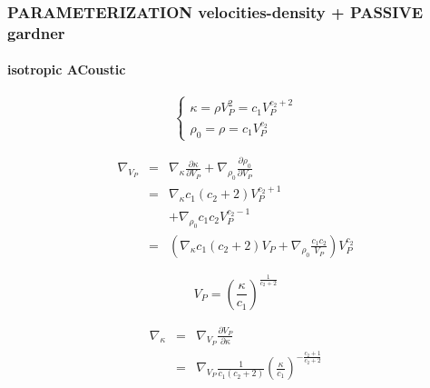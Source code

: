 \documentclass[9pt]{beamer}
\newcommand{\partderi}[2]{\frac{\partial#1}{\partial#2}}
\begin{document}
\begin{frame}\frametitle{PARAMETERIZATION velocities-density + PASSIVE gardner}
\framesubtitle{isotropic ACoustic}

  \begin{center}
  \end{center}

  \begin{minipage}{0.5\linewidth}
    \[\left\{ \begin{array}{l}
      \kappa = \rho V_P^2 = c_1 V_P^{c_2+2} \\
      \rho_0 = \rho = c_1 V_P ^{c_2}
    \end{array} \right.\]
    
    \begin{eqnarray}
      \nabla_{V_P} &=& \nabla_{\kappa} \partderi{\kappa}{V_P} + \nabla_{\rho_0} \partderi{\rho_0}{V_P} \nonumber\\
                   &=& \nabla_{\kappa} c_1(c_2+2) V_P^{c_2+1} \nonumber\\
                   & &+\nabla_{\rho_0} c_1 c_2 V_P^{c_2-1} \nonumber\\
                   &=& \left( \nabla_{\kappa} c_1(c_2+2) V_P + \nabla_{\rho_0} \frac{c_1 c_2}{V_P} \right) V_P^{c_2} \nonumber
    \end{eqnarray}

  \end{minipage} \vline
  \begin{minipage}{0.45\linewidth}
    \[ V_P = \left(\frac{\kappa}{c_1}\right)^{\frac{1}{c_2+2}} \]
    
    \begin{eqnarray}
      \nabla_{\kappa} &=& \nabla_{V_P} \partderi{V_P}{\kappa} \nonumber\\
                      &=& \nabla_{V_P} \frac{1}{c_1(c_2+2)} \left(\frac{\kappa}{c_1}\right)^{-\frac{c_2+1}{c_2+2}} \nonumber
    \end{eqnarray}
  \end{minipage}

\end{frame}
\end{document}
